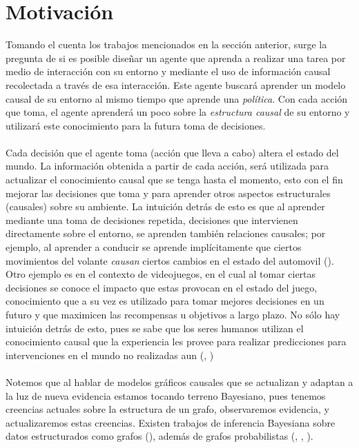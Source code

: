 \documentclass[11pt]{article}
\theoremstyle{plain}
\begin{document}
\section{Motivación}
Tomando el cuenta los trabajos mencionados en la sección anterior, surge la pregunta de si es posible diseñar un agente que aprenda a realizar una tarea por medio de interacción con su entorno y mediante el uso de información causal recolectada a través de esa interacción. Este agente buscará aprender un modelo causal de su entorno al mismo tiempo que aprende una \textit{política}. Con cada acción que toma, el agente aprenderá  un poco sobre la \textit{estructura causal} de su entorno y utilizará este conocimiento para la futura toma de decisiones.\\
\\
Cada decisión que el agente toma (acción que lleva a cabo) altera el estado del mundo. La información obtenida a partir de cada acción, será utilizada para actualizar el conocimiento causal que se tenga hasta el momento, esto con el fin mejorar las decisiones que toma y para aprender otros aspectos estructurales (causales) sobre su ambiente. La intuición detrás de esto es que al aprender mediante una toma de decisiones repetida, decisiones que intervienen directamente sobre el entorno, se aprenden también relaciones causales; por ejemplo, al aprender a conducir se aprende implícitamente que ciertos movimientos del volante \textit{causan} ciertos cambios en el estado del automovil (\cite{danks2014unifying}). Otro ejemplo es en el contexto de videojuegos, en el cual al tomar ciertas decisiones se conoce el impacto que estas provocan en el estado del juego, conocimiento que a su vez es utilizado para tomar mejores decisiones en un futuro y que maximicen las recompensas u objetivos a largo plazo. No sólo hay intuición detrás de esto, pues se sabe que los seres humanos utilizan el conocimiento causal que la experiencia les provee para realizar predicciones para intervenciones en el mundo no realizadas aun (\cite{meder2008inferring}, \cite{hagmayer2009decision})\\
\\
Notemos que al hablar de modelos gráficos causales que se actualizan y adaptan a la luz de nueva evidencia estamos tocando terreno Bayesiano, pues tenemos creencias actuales sobre la estructura de un grafo, observaremos evidencia, y actualizaremos estas creencias. Existen trabajos de inferencia Bayesiana sobre datos estructurados como grafos (\cite{acar2007adaptive}), además de grafos probabilistas (\cite{pearl1988probabilistic}, \cite{koller2009probabilistic}, \cite{sucar2015probabilistic} ). \\
\end{document}
